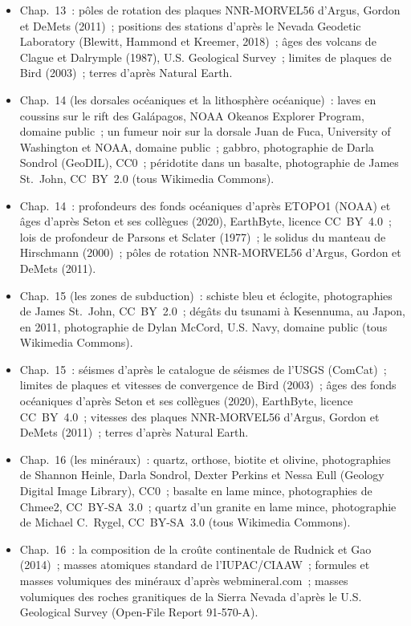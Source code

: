 \begin{itemize}
  \item Chap.~13~: pôles de rotation des plaques NNR-MORVEL56 d'Argus, Gordon et DeMets (2011)~; positions des stations d'après le Nevada Geodetic Laboratory (Blewitt, Hammond et Kreemer, 2018)~; âges des volcans de Clague et Dalrymple (1987), U.S. Geological Survey~; limites de plaques de Bird (2003)~; terres d'après Natural Earth.
  \item Chap.~14 (les dorsales océaniques et la lithosphère océanique)~: laves en coussins sur le rift des Galápagos, NOAA Okeanos Explorer Program, domaine public~; un fumeur noir sur la dorsale Juan de Fuca, University of Washington et NOAA, domaine public~; gabbro, photographie de Darla Sondrol (GeoDIL), CC0~; péridotite dans un basalte, photographie de James St.~John, CC~BY~2.0 (tous Wikimedia Commons).
  \item Chap.~14~: profondeurs des fonds océaniques d'après ETOPO1 (NOAA) et âges d'après Seton et ses collègues (2020), EarthByte, licence CC~BY~4.0~; lois de profondeur de Parsons et Sclater (1977)~; le solidus du manteau de Hirschmann (2000)~; pôles de rotation NNR-MORVEL56 d'Argus, Gordon et DeMets (2011).
  \item Chap.~15 (les zones de subduction)~: schiste bleu et éclogite, photographies de James St.~John, CC~BY~2.0~; dégâts du tsunami à Kesennuma, au Japon, en 2011, photographie de Dylan McCord, U.S. Navy, domaine public (tous Wikimedia Commons).
  \item Chap.~15~: séismes d'après le catalogue de séismes de l'USGS (ComCat)~; limites de plaques et vitesses de convergence de Bird (2003)~; âges des fonds océaniques d'après Seton et ses collègues (2020), EarthByte, licence CC~BY~4.0~; vitesses des plaques NNR-MORVEL56 d'Argus, Gordon et DeMets (2011)~; terres d'après Natural Earth.
  \item Chap.~16 (les minéraux)~: quartz, orthose, biotite et olivine, photographies de Shannon Heinle, Darla Sondrol, Dexter Perkins et Nessa Eull (Geology Digital Image Library), CC0~; basalte en lame mince, photographies de Chmee2, CC~BY-SA~3.0~; quartz d'un granite en lame mince, photographie de Michael C.~Rygel, CC~BY-SA~3.0 (tous Wikimedia Commons).
  \item Chap.~16~: la composition de la croûte continentale de Rudnick et Gao (2014)~; masses atomiques standard de l'IUPAC/CIAAW~; formules et masses volumiques des minéraux d'après webmineral.com~; masses volumiques des roches granitiques de la Sierra Nevada d'après le U.S. Geological Survey (Open-File Report 91-570-A).

\end{itemize}
